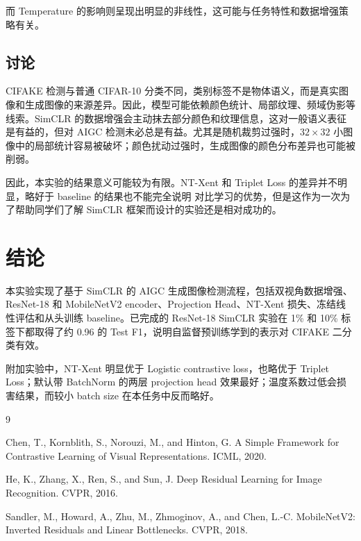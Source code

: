 \documentclass{ctexart}
\begin{document}
而 Temperature 的影响则呈现出明显的非线性，这可能与任务特性和数据增强策略有关。

\subsection{讨论}

CIFAKE 检测与普通 CIFAR-10 分类不同，类别标签不是物体语义，而是真实图像和生成图像的来源差异。因此，模型可能依赖颜色统计、局部纹理、频域伪影等线索。SimCLR 的数据增强会主动抹去部分颜色和纹理信息，这对一般语义表征是有益的，但对 AIGC 检测未必总是有益。尤其是随机裁剪过强时，$32\times32$ 小图像中的局部统计容易被破坏；颜色扰动过强时，生成图像的颜色分布差异也可能被削弱。

因此，本实验的结果意义可能较为有限。NT-Xent 和 Triplet Loss 的差异并不明显，略好于 baseline 的结果也不能完全说明 对比学习的优势，但是这作为一次为了帮助同学们了解 SimCLR 框架而设计的实验还是相对成功的。

\section{结论}

本实验实现了基于 SimCLR 的 AIGC 生成图像检测流程，包括双视角数据增强、ResNet-18 和 MobileNetV2 encoder、Projection Head、NT-Xent 损失、冻结线性评估和从头训练 baseline。已完成的 ResNet-18 SimCLR 实验在 1\% 和 10\% 标签下都取得了约 0.96 的 Test F1，说明自监督预训练学到的表示对 CIFAKE 二分类有效。

附加实验中，NT-Xent 明显优于 Logistic contrastive loss，也略优于 Triplet Loss；默认带 BatchNorm 的两层 projection head 效果最好；温度系数过低会损害结果，而较小 batch size 在本任务中反而略好。

\begin{thebibliography}{9}

Chen, T., Kornblith, S., Norouzi, M., and Hinton, G. A Simple Framework for Contrastive Learning of Visual Representations. ICML, 2020.

He, K., Zhang, X., Ren, S., and Sun, J. Deep Residual Learning for Image Recognition. CVPR, 2016.

Sandler, M., Howard, A., Zhu, M., Zhmoginov, A., and Chen, L.-C. MobileNetV2: Inverted Residuals and Linear Bottlenecks. CVPR, 2018.

\end{thebibliography}
\end{document}
